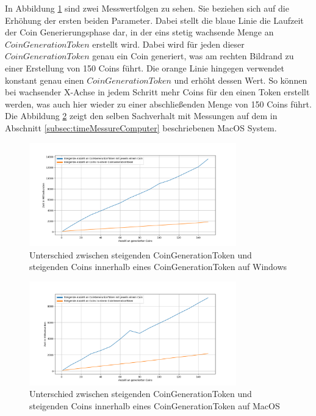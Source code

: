 \documentclass[
	fontsize=12pt,
	headings=small,
	parskip=half,           %
	bibliography=totoc,
	numbers=noenddot,       %
	open=any,               %
]{scrreprt}
\begin{document}
In Abbildung \ref{fig:win_coins} sind zwei Messwertfolgen zu sehen. Sie beziehen sich auf die Erhöhung der ersten beiden Parameter. Dabei stellt die blaue Linie die Laufzeit der Coin Generierungsphase dar, in der eins stetig wachsende Menge an $CoinGenerationToken$ erstellt wird. Dabei wird für jeden dieser $CoinGenerationToken$ genau ein Coin generiert, was am rechten Bildrand zu einer Erstellung von 150 Coins führt. Die orange Linie hingegen verwendet konstant genau einen $CoinGenerationToken$ und erhöht dessen Wert. So können bei wachsender X-Achse in jedem Schritt mehr Coins für den einen Token erstellt werden, was auch hier wieder zu einer abschließenden Menge von 150 Coins führt. Die Abbildung \ref{fig:mac_coins} zeigt den selben Sachverhalt mit Messungen auf dem in Abschnitt \ref{subsec:timeMessureComputer} beschriebenen MacOS System.
\begin{figure}[h]
    \caption{Unterschied zwischen steigenden CoinGenerationToken und steigenden Coins innerhalb eines CoinGenerationToken auf Windows}
    \label{fig:win_coins}
    \centering
    \includegraphics[width=0.8\textwidth]{figure_win_coins.png}
\end{figure}
\begin{figure}[h]
    \caption{Unterschied zwischen steigenden CoinGenerationToken und steigenden Coins innerhalb eines CoinGenerationToken auf MacOS}
    \label{fig:mac_coins}
    \centering
    \includegraphics[width=0.8\textwidth]{figure_mac_coins.png}
\end{figure}
\end{document}
